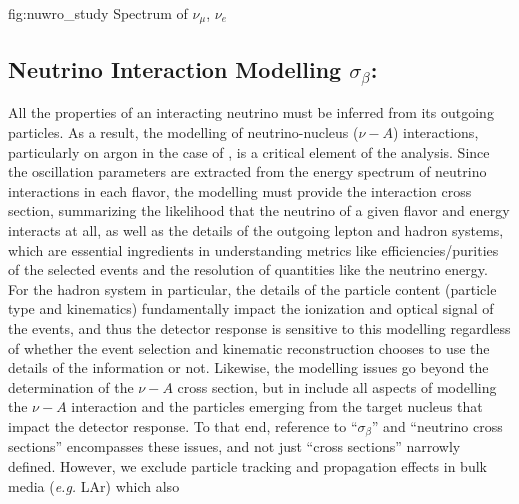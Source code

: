\begin{dunefigure}[$\nu_\mu$,$\nu_e$ at \dword{nd}]{fig:nuwro_study}
{Spectrum of $\nu_\mu$, $\nu_e$}
\end{dunefigure}

\subsection{Neutrino Interaction Modelling $\sigma_\beta$:}
All the properties of an interacting neutrino must be inferred from its outgoing particles. As a result, the modelling of neutrino-nucleus ($\nu-A$) interactions, particularly on argon in the case of , is a critical element of the analysis. Since the oscillation parameters are extracted from the energy spectrum of neutrino interactions in each flavor, the modelling must provide the interaction cross section, summarizing the likelihood that the neutrino of a given flavor and energy interacts at all, as well as the details of the outgoing lepton and hadron systems, which are essential ingredients in understanding metrics like efficiencies/purities of the selected events and the resolution of quantities like the neutrino energy. For the hadron system in particular, the details of the particle content (particle type and kinematics) fundamentally impact the ionization and optical signal of the events, and thus the detector response is sensitive to this modelling regardless of whether the event selection and kinematic reconstruction chooses to use the details of the information or not.
Likewise, the modelling issues go beyond the determination of the $\nu-A$ cross section, but in include all aspects of modelling the $\nu-A$ interaction and the particles emerging from the target nucleus that impact the detector response. To that end, reference to ``$\sigma_\beta$'' and ``neutrino cross sections'' encompasses these issues, and not just ``cross sections'' narrowly defined. However, we exclude particle tracking and propagation effects in bulk media ({\em e.g.} LAr) which also  

